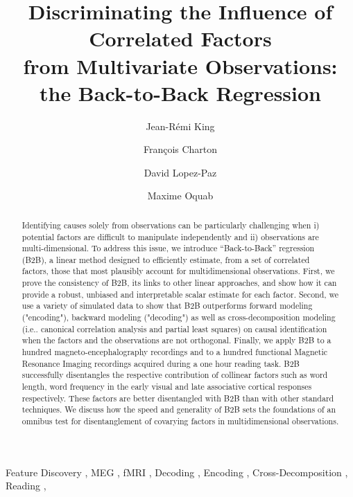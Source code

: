 \documentclass[preprint,12pt,3p]{elsarticle}
\begin{document}
\begin{frontmatter}

\title{Discriminating the Influence of Correlated Factors \\from Multivariate Observations: the Back-to-Back Regression}

\author[1,2]{Jean-Rémi King}

\author[2]{Fran\c{c}ois Charton}
\author[2]{David Lopez-Paz}
\author[2]{Maxime Oquab}
\address[1]{Laboratoire des systèmes perceptifs, PSL University, CNRS}
\address[2]{Facebook AI}


\begin{abstract}
Identifying causes solely from observations can be particularly challenging when
i) potential factors are difficult to manipulate independently and ii)
observations are multi-dimensional. To address this issue, we
introduce ``Back-to-Back'' regression (B2B), a linear method designed to efficiently
estimate, from a set of correlated factors, those that most plausibly account for
multidimensional observations. First, we prove the consistency of B2B, its links to
other linear approaches, and show how it can provide a robust, unbiased and
interpretable scalar estimate for each factor.
Second, we use a variety of simulated data to show that B2B outperforms
forward modeling ("encoding"), backward modeling ("decoding") as well as
cross-decomposition modeling (i.e.. canonical
correlation analysis and partial least squares) on causal identification when
the factors and the observations are not orthogonal.
Finally, we apply B2B to a hundred magneto-encephalography recordings and to a hundred functional Magnetic
Resonance Imaging recordings acquired during a one hour reading task. B2B successfully disentangles
the respective contribution of collinear factors such as word length, word
frequency in the early visual and late associative cortical
responses respectively. These factors are better disentangled with B2B than with
other standard techniques. We discuss how the speed and generality of B2B
sets the foundations of an omnibus test for disentanglement of covarying
factors in multidimensional observations.
\end{abstract}


\begin{keyword}
  Feature Discovery \sep
  MEG \sep
  fMRI \sep
  Decoding \sep
  Encoding \sep
  Cross-Decomposition \sep
  Reading \sep
\end{keyword}

\end{frontmatter}
\end{document}
